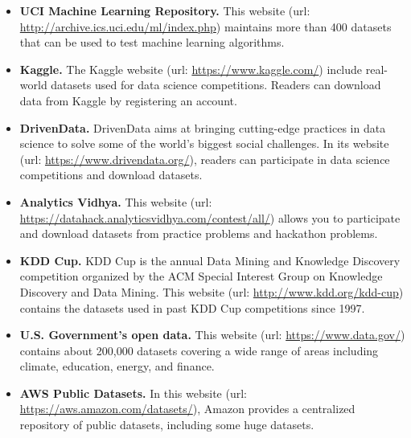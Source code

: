 \documentclass[
  12pt,
  krantz2]{Format/krantzNoCorner}
\providecommand{\tightlist}{%
  \setlength{\itemsep}{0pt}\setlength{\parskip}{0pt}}
\begin{document}
\begin{itemize}
\tightlist
\item
  \textbf{UCI Machine Learning Repository.} This website (url: \url{http://archive.ics.uci.edu/ml/index.php}) maintains more than 400 datasets that can be used to test machine learning algorithms.
\item
  \textbf{Kaggle.} The Kaggle website (url: \url{https://www.kaggle.com/}) include real-world datasets used for data science competitions. Readers can download data from Kaggle by registering an account.
\item
  \textbf{DrivenData.} DrivenData aims at bringing cutting-edge practices in data science to solve some of the world's biggest social challenges. In its website (url: \url{https://www.drivendata.org/}), readers can participate in data science competitions and download datasets.
\item
  \textbf{Analytics Vidhya.} This website (url: \url{https://datahack.analyticsvidhya.com/contest/all/}) allows you to participate and download datasets from practice problems and hackathon problems.
\item
  \textbf{KDD Cup.} KDD Cup is the annual Data Mining and Knowledge Discovery competition organized by the ACM Special Interest Group on Knowledge Discovery and Data Mining. This website (url: \url{http://www.kdd.org/kdd-cup}) contains the datasets used in past KDD Cup competitions since 1997.
\item
  \textbf{U.S. Government's open data.} This website (url: \url{https://www.data.gov/}) contains about 200,000 datasets covering a wide range of areas including climate, education, energy, and finance.
\item
  \textbf{AWS Public Datasets.} In this website (url: \url{https://aws.amazon.com/datasets/}), Amazon provides a centralized repository of public datasets, including some huge datasets.
\end{itemize}

  
\end{document}
